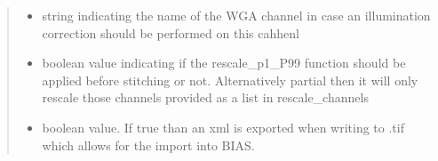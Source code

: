 \documentclass[a4paper,10pt,english,openany,oneside]{sphinxmanual}
\begin{document}
\begin{fulllineitems}
\begin{quote}
\begin{description}
\begin{itemize}
\item {} 
\sphinxAtStartPar
{} \textendash{} string indicating the name of the WGA channel in case an illumination correction should be performed on this cahhenl

\item {} 
\sphinxAtStartPar
{} \textendash{} boolean value indicating if the rescale\_p1\_P99 function should be applied before stitching or not. Alternatively partial then it will only
rescale those channels provided as a list in rescale\_channels

\item {} 
\sphinxAtStartPar
{} \textendash{} boolean value. If true than an xml is exported when writing to .tif which allows for the import into BIAS.

\end{itemize}

\end{description}\end{quote}

\end{fulllineitems}

\end{document}

